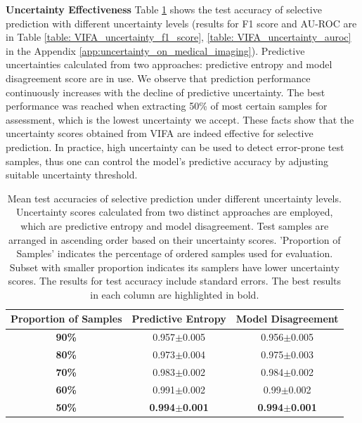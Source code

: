 \documentclass[10pt]{article} %
\begin{document}
\textbf{Uncertainty Effectiveness} Table \ref{table: VIFA_uncertainty_acc} shows the test accuracy of selective prediction with different uncertainty levels (results for F1 score and AU-ROC are in Table \ref{table: VIFA_uncertainty_f1_score}, \ref{table: VIFA_uncertainty_auroc} in the Appendix \ref{app:uncertainty_on_medical_imaging}). Predictive uncertainties calculated from two approaches: predictive entropy and model disagreement score are in use. We observe that prediction performance continuously increases with the decline of predictive uncertainty. The best performance was reached when extracting 50\% of most certain samples for assessment, which is the lowest uncertainty we accept. These facts show that the uncertainty scores obtained from VIFA are indeed effective for selective prediction. In practice, high uncertainty can be used to detect error-prone test samples, thus one can control the model's predictive accuracy by adjusting suitable uncertainty threshold. 


\begin{table}[htp]
\caption{Mean test accuracies of selective prediction under different uncertainty levels. Uncertainty scores calculated from two distinct approaches are employed, which are predictive entropy and model disagreement. Test samples are arranged in ascending order based on their uncertainty scores. 'Proportion of Samples' indicates the percentage of ordered samples used for evaluation. Subset with smaller proportion indicates its samplers have lower uncertainty scores. The results for test accuracy include standard errors. The best results in each column are highlighted in bold.}
\label{table: VIFA_uncertainty_acc}
\begin{center}
\begin{tabular}{c|cc}
\textbf{Proportion of Samples} & \textbf{Predictive Entropy} & \textbf{Model Disagreement} \\ \hline
\textbf{90\%}                               & 0.957$\pm$0.005                 & 0.956$\pm$0.005                 \\
\textbf{80\%}                               & 0.973$\pm$0.004                 & 0.975$\pm$0.003                 \\
\textbf{70\%}                               & 0.983$\pm$0.002                 & 0.984$\pm$0.002                 \\
\textbf{60\%}                               & 0.991$\pm$0.002                 & 0.99$\pm$0.002                  \\
\textbf{50\%}                               & \textbf{0.994$\pm$0.001}                 & \textbf{0.994$\pm$0.001}        
\end{tabular}
\end{center}
\end{table}
\end{document}
